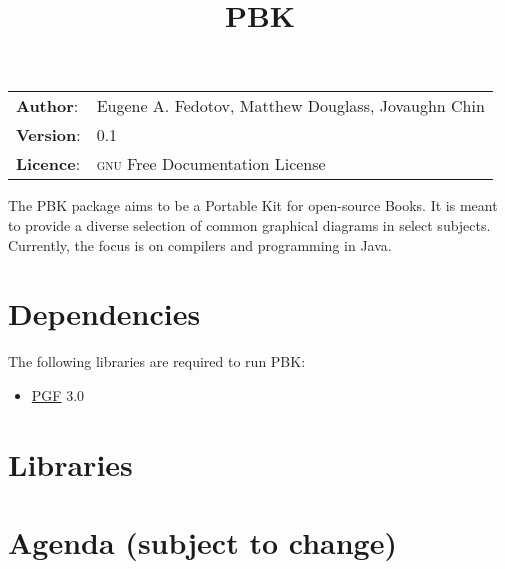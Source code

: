 \documentclass[10pt,a4paper,english]{article}
\title{PBK}
\author{}
\date{}
\newlength{\docinfowidth}
\newlength{\locallinewidth}
\begin{document}
\maketitle
\begin{center}
\begin{tabularx}{\docinfowidth}{lX}
\textbf{Author}: &
	Eugene A. Fedotov, Matthew Douglass, Jovaughn Chin \\
\textbf{Version}: &
	0.1 \\
\textbf{Licence}: &
	\textsc{gnu} Free
	Documentation License \\
\end{tabularx}
\end{center}

\setlength{\locallinewidth}{\linewidth}


The PBK package aims to be a Portable Kit for open-source Books. It is meant to provide a diverse selection of common graphical diagrams in select subjects. Currently, the focus is on compilers and programming in Java.



\section*{Dependencies}
\label{dependencies}

The following libraries are required to run PBK:
\begin{itemize}
\item {} 
\href{https://www.ctan.org/pkg/pgf}{PGF} 3.0
\end{itemize}



\section*{Libraries}
\label{libraries}




\section*{Agenda \small{(subject to change)}}
\end{document}
